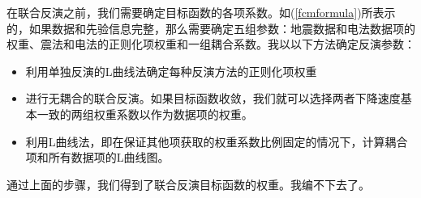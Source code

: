 在联合反演之前，我们需要确定目标函数的各项系数。如(\ref{fcmformula})所表示的，如果数据和先验信息完整，那么需要确定五组参数：地震数据和电法数据项的权重、震法和电法的正则化项权重和一组耦合系数。我以以下方法确定反演参数：

\begin{itemize}
    \item 利用单独反演的L曲线法确定每种反演方法的正则化项权重
    \item 进行无耦合的联合反演。如果目标函数收敛，我们就可以选择两者下降速度基本一致的两组权重系数以作为数据项的权重。
    \item 利用L曲线法，即在保证其他项获取的权重系数比例固定的情况下，计算耦合项和所有数据项的L曲线图。
\end{itemize}

通过上面的步骤，我们得到了联合反演目标函数的权重。我编不下去了。
